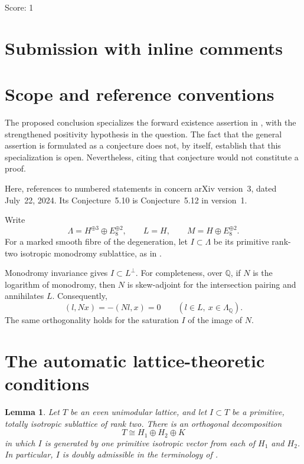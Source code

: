 \documentclass[11pt]{article}
\newcommand{\Q}{\mathbb Q}
\newtheorem{lemma}{Lemma}[section]
\theoremstyle{remark}
\begin{document}
\noindent Score: 1

\newpage
\section{Submission with inline comments}


\begin{abstract}
I cannot provide a complete proof of the assertion in the question.
The argument below establishes its lattice-theoretic prerequisites and
identifies the remaining geometric existence problem.  It is not a proof
of the requested theorem.
\end{abstract}

\section{Scope and reference conventions}

The proposed conclusion specializes the forward existence assertion in
\cite[Conjecture~5.10]{GT24}, with the strengthened positivity hypothesis
in the question.
The fact that the general assertion is formulated as a conjecture does
not, by itself, establish that this specialization is open.
Nevertheless, citing that conjecture would not constitute a proof.

Here, references to numbered statements in \cite{GT24} concern
arXiv version~3, dated July~22, 2024.  Its Conjecture~5.10 is
Conjecture~5.12 in version~1.

Write
\[
 \Lambda=H^{\oplus 3}\oplus E_8^{\oplus 2},
 \qquad L=H,
 \qquad M=H\oplus E_8^{\oplus 2}.
\]
For a marked smooth fibre of the degeneration, let
\(I\subset\Lambda\) be its primitive rank-two isotropic monodromy
sublattice, as in \cite[Section~3.1]{GT24}.

Monodromy invariance gives \(I\subset L^\perp\).
For completeness, over \(\Q\), if \(N\) is the logarithm of monodromy,
then \(N\) is skew-adjoint for the intersection pairing and annihilates
\(L\).  Consequently,
\[
 (l,Nx)=-(Nl,x)=0
 \qquad(l\in L,\ x\in\Lambda_\Q).
\]
The same orthogonality holds for the saturation \(I\) of the image of
\(N\).

\section{The automatic lattice-theoretic conditions}

\begin{lemma}\label{lem:split}
Let \(T\) be an even unimodular lattice, and let
\(I\subset T\) be a primitive, totally isotropic sublattice of rank two.
There is an orthogonal decomposition
\[
 T\cong H_1\oplus H_2\oplus K
\]
in which \(I\) is generated by one primitive isotropic vector from each
of \(H_1\) and \(H_2\).
In particular, \(I\) is doubly admissible in the terminology of
\cite[Definition~3.31]{GT24}.
\end{lemma}
\end{document}
